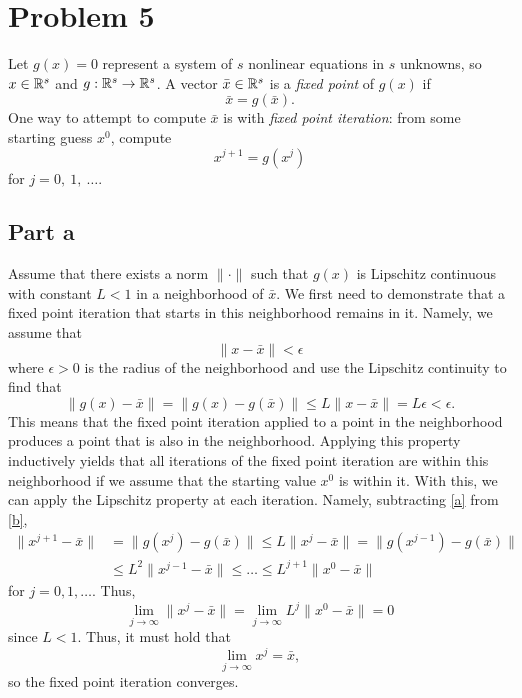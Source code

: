 \documentclass{article}
\begin{document}
\section{Problem 5}
Let $g(x)=0$ represent a system of $s$ nonlinear equations in $s$ unknowns,
so $x\in\mathbb{R}^s$ and $g: \mathbb{R}^s \to \mathbb{R}^s$.  A vector $\bar
x\in\mathbb{R}^s$ is a {\em fixed point} of $g(x)$ if 
\begin{equation}\label{a}
	\bar x = g(\bar x).
\end{equation}
One way to attempt to compute $\bar x$ is with {\em fixed point iteration}:
from some starting guess $x^0$, compute
\begin{equation}\label{b}
	x^{j+1} = g(x^j)
\end{equation}
for $j=0,~1,~\ldots$.

\subsection{Part a}
Assume that there exists a norm $\|\cdot\|$ such that $g(x)$ is
Lipschitz continuous with constant $L<1$ in a neighborhood of $\bar x$. We first need to demonstrate that a fixed point iteration that starts in this neighborhood remains in it. Namely, we assume that 
\[
\|x-\bar{x}\|<\epsilon
\]
where $\epsilon>0$ is the radius of the neighborhood and use the Lipschitz continuity to find that 
\[
\|g(x)-\bar{x}\|=\|g(x)-g(\bar{x})\|\leq L\|x-\bar{x}\|=L\epsilon<\epsilon.
\]
This means that the fixed point iteration applied to a point in the neighborhood produces a point that is also in the neighborhood. Applying this property inductively yields that all iterations of the fixed point iteration are within this neighborhood if we assume that the starting value $x^0$ is within it. With this, we can apply the Lipschitz property at each iteration. Namely, subtracting \eqref{a} from \eqref{b},
\begin{align*}
\|x^{j+1}-\bar{x}\|&=\|g(x^j)-g(\bar{x})\|\leq L\|x^j-\bar{x}\|=\|g(x^{j-1})-g(\bar{x})\|\\&\leq
L^2\|x^{j-1}-\bar{x}\|\leq\ldots\leq L^{j+1}\|x^0-\bar{x}\|
\end{align*}
for $j=0,1,\ldots$. Thus,
\[
\lim_{j\to\infty}\|x^j-\bar{x}\|=\lim_{j\to\infty}L^j\|x^0-\bar{x}\|=0
\]
since $L<1$. Thus, it must hold that
\[
\lim_{j\to\infty}x^j=\bar{x},
\]
so the fixed point iteration converges. 
\end{document}
